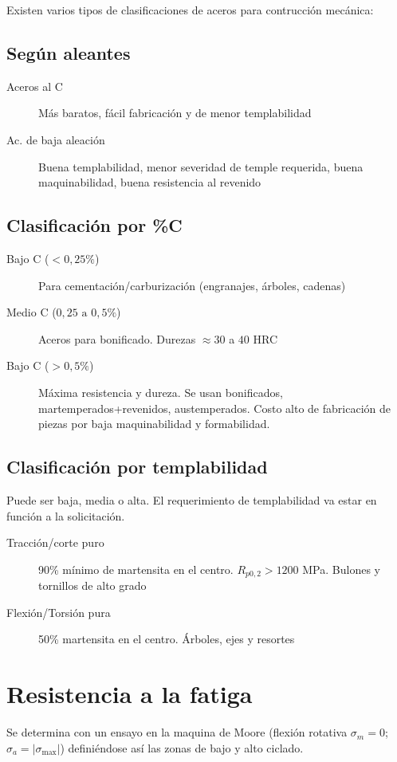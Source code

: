 \documentclass{article}
\begin{document}
Existen varios tipos de clasificaciones de aceros para contrucción mecánica:

\subsection*{Según aleantes}
\begin{description}
	\item[Aceros al C] Más baratos, fácil fabricación y de menor templabilidad
	\item[Ac. de baja aleación] Buena templabilidad, menor severidad de temple requerida, buena maquinabilidad, buena resistencia al revenido
\end{description}


\subsection*{Clasificación por \%C}
\begin{description}
	\item[Bajo C ($<0,25\%$)] Para cementación/carburización (engranajes, árboles, cadenas)
	\item[Medio C ($0,25 \textrm{ a }0,5\%$)] Aceros para bonificado. Durezas $\approx 30$ a $40$ HRC
	\item[Bajo C ($>0,5\%$)] Máxima resistencia y dureza. Se usan bonificados, martemperados+revenidos, austemperados. Costo alto de fabricación de piezas por baja maquinabilidad y formabilidad.
\end{description}

\subsection*{Clasificación por templabilidad}
Puede ser baja, media o alta. El requerimiento de templabilidad va estar en función a la solicitación.

\begin{description}
	\item[Tracción/corte puro] 90\% mínimo de martensita en el centro. $R_{p0,2}>1200$ MPa. Bulones y tornillos de alto grado
	\item[Flexión/Torsión pura] 50\% martensita en el centro. Árboles, ejes y resortes
\end{description}

\section{Resistencia a la fatiga}
Se determina con un ensayo en la maquina de Moore (flexión rotativa $\sigma_m=0$;$\sigma_a = |\sigma_{\max}|$) definiéndose así las zonas de bajo y alto ciclado.
\end{document}
